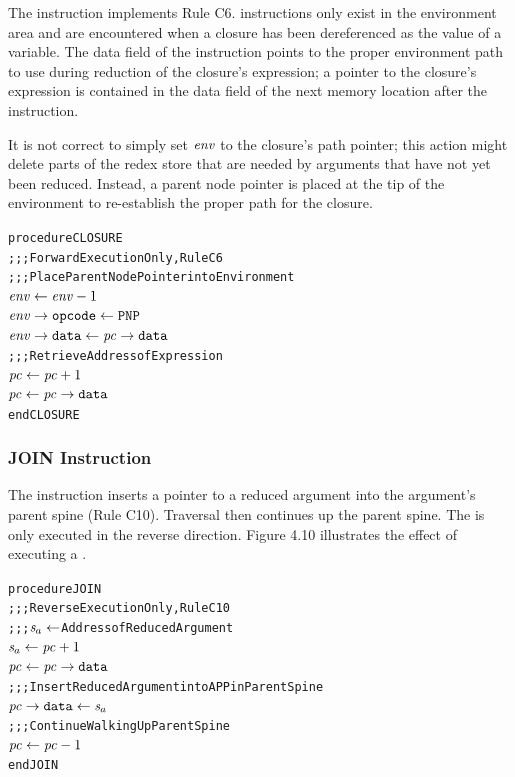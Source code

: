 The  instruction implements Rule C6.  instructions only exist in the environment area and are encountered when a closure has been dereferenced as the value of a variable. The data field of the  instruction points to the proper environment path to use during reduction of the closure's expression; a pointer to the closure's expression is contained in the data field of the next memory location after the  instruction.

It is not correct to simply set \(\mathit{env}\) to the closure's path pointer; this action might delete parts of the redex store that are needed by arguments that have not yet been reduced. Instead, a parent node pointer is placed at the tip of the environment to re-establish the proper path for the closure.

\par\smallskip\noindent\begin{minipage}{\linewidth}
\begin{alltt}
procedure CLOSURE
  \textrm{;;; Forward Execution Only, Rule C6}
  \textrm{;;; Place Parent Node Pointer into Environment}
  \(\rt{env} \leftarrow \rt{env}-1\)
  \(\rtfield{env}{opcode} \leftarrow \mathtt{PNP}\)
  \(\rtfield{env}{data} \leftarrow \rtfield{pc}{data}\)
  \textrm{;;; Retrieve Address of Expression}
  \(\rt{pc} \leftarrow \rt{pc}+1\)
  \(\rt{pc} \leftarrow \rtfield{pc}{data}\)
end CLOSURE
\end{alltt}
\end{minipage}\par\smallskip


\subsubsection*{JOIN Instruction}

The  instruction inserts a pointer to a reduced argument into the argument's parent spine (Rule C10). Traversal then continues up the parent spine. The  is only executed in the reverse direction. Figure 4.10 illustrates the effect of executing a .

\par\smallskip\noindent\begin{minipage}{\linewidth}
\begin{alltt}
procedure JOIN
  \textrm{;;; Reverse Execution Only, Rule C10}
  \textrm{;;; \(\rtsa \leftarrow\) Address of Reduced Argument}
  \(\rtsa \leftarrow \rt{pc}+1\)
  \(\rt{pc} \leftarrow \rtfield{pc}{data}\)
  \textrm{;;; Insert Reduced Argument into APP in Parent Spine}
  \(\rtfield{pc}{data} \leftarrow \rtsa\)
  \textrm{;;; Continue Walking Up Parent Spine}
  \(\rt{pc} \leftarrow \rt{pc}-1\)
end JOIN
\end{alltt}
\end{minipage}\par\smallskip



